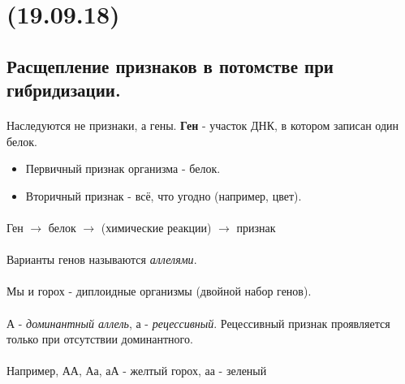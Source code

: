 \documentclass[dvipdfmx]{article}
\begin{document}
\noindent\makebox[\linewidth]{\rule{\paperwidth}{0.4pt}}
\section{(19.09.18)}
\noindent\makebox[\linewidth]{\rule{\paperwidth}{0.4pt}}

\subsection{Расщепление признаков в потомстве при гибридизации.}
\paragraph{}

Наследуются не признаки, а гены. \textbf{Ген} - участок ДНК, в котором записан один белок.

\begin{itemize}
\item
  Первичный признак организма - белок.
\item
  Вторичный признак - всё, что угодно (например, цвет).
\end{itemize}

\paragraph{}
Ген $\rightarrow$ белок $\rightarrow$ (химические реакции) $\rightarrow$ признак

\paragraph{}
Варианты генов называются \textit{аллелями}.

\paragraph{}
Мы и горох - диплоидные организмы (двойной набор генов).

\paragraph{}
А - \textit{доминантный аллель}, а - \textit{рецессивный}.
Рецессивный признак проявляется только при отсутствии доминантного.

\paragraph{}
Например, АА, Аа, аА - желтый горох, аа - зеленый
\end{document}
